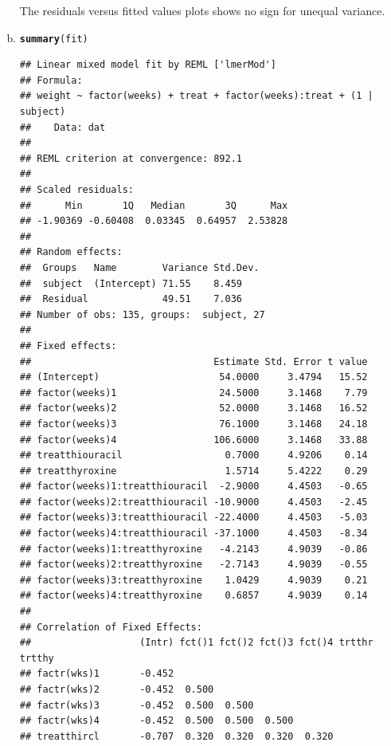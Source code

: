 \documentclass{article}\usepackage[]{graphicx}\usepackage[]{color}
\makeatletter
\newcommand{\hlstd}[1]{\textcolor[rgb]{0.345,0.345,0.345}{#1}}%
\newcommand{\hlkwd}[1]{\textcolor[rgb]{0.737,0.353,0.396}{\textbf{#1}}}%
\newenvironment{kframe}{%
 \def\at@end@of@kframe{}%
 \ifinner\ifhmode%
  \def\at@end@of@kframe{\end{minipage}}%
  \begin{minipage}{\columnwidth}%
 \fi\fi%
 \def\FrameCommand##1{\hskip\@totalleftmargin \hskip-\fboxsep
 \colorbox{shadecolor}{##1}\hskip-\fboxsep
     \hskip-\linewidth \hskip-\@totalleftmargin \hskip\columnwidth}%
 \MakeFramed {\advance\hsize-\width
   \@totalleftmargin\z@ \linewidth\hsize
   \@setminipage}}%
 {\par\unskip\endMakeFramed%
 \at@end@of@kframe}
\newenvironment{knitrout}{}{} %
\makeatother
\begin{document}
\begin{enumerate}[(a)]
\begin{knitrout}
\end{knitrout}

\qquad The residuals versus fitted values plots shows no sign for unequal variance.

\item

\begin{knitrout}
\color{fgcolor}\begin{kframe}
\begin{alltt}
  \hlkwd{summary}\hlstd{(fit)}
\end{alltt}
\begin{verbatim}
## Linear mixed model fit by REML ['lmerMod']
## Formula: 
## weight ~ factor(weeks) + treat + factor(weeks):treat + (1 | subject)
##    Data: dat
## 
## REML criterion at convergence: 892.1
## 
## Scaled residuals: 
##      Min       1Q   Median       3Q      Max 
## -1.90369 -0.60408  0.03345  0.64957  2.53828 
## 
## Random effects:
##  Groups   Name        Variance Std.Dev.
##  subject  (Intercept) 71.55    8.459   
##  Residual             49.51    7.036   
## Number of obs: 135, groups:  subject, 27
## 
## Fixed effects:
##                                Estimate Std. Error t value
## (Intercept)                     54.0000     3.4794   15.52
## factor(weeks)1                  24.5000     3.1468    7.79
## factor(weeks)2                  52.0000     3.1468   16.52
## factor(weeks)3                  76.1000     3.1468   24.18
## factor(weeks)4                 106.6000     3.1468   33.88
## treatthiouracil                  0.7000     4.9206    0.14
## treatthyroxine                   1.5714     5.4222    0.29
## factor(weeks)1:treatthiouracil  -2.9000     4.4503   -0.65
## factor(weeks)2:treatthiouracil -10.9000     4.4503   -2.45
## factor(weeks)3:treatthiouracil -22.4000     4.4503   -5.03
## factor(weeks)4:treatthiouracil -37.1000     4.4503   -8.34
## factor(weeks)1:treatthyroxine   -4.2143     4.9039   -0.86
## factor(weeks)2:treatthyroxine   -2.7143     4.9039   -0.55
## factor(weeks)3:treatthyroxine    1.0429     4.9039    0.21
## factor(weeks)4:treatthyroxine    0.6857     4.9039    0.14
## 
## Correlation of Fixed Effects:
##                   (Intr) fct()1 fct()2 fct()3 fct()4 trtthr trtthy
## factr(wks)1       -0.452                                          
## factr(wks)2       -0.452  0.500                                   
## factr(wks)3       -0.452  0.500  0.500                            
## factr(wks)4       -0.452  0.500  0.500  0.500                     
## treatthircl       -0.707  0.320  0.320  0.320  0.320              

\end{verbatim}
\end{kframe}
\end{knitrout}
\end{enumerate}
\end{document}
